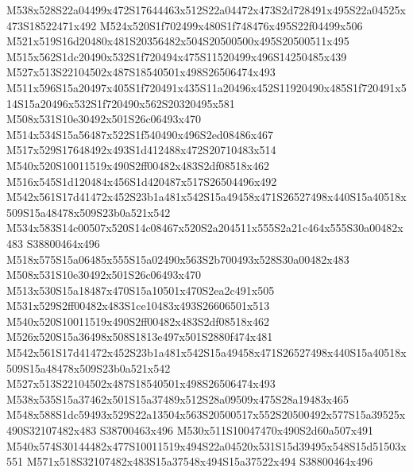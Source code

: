 \documentclass{article}
\begin{document}
\begin{multicols}{2}

M538x528S22a04499x472S17644463x512S22a04472x473S2d728491x495S22a04525x473S18522471x492 M524x520S1f702499x480S1f748476x495S22f04499x506 M521x519S16d20480x481S20356482x504S20500500x495S20500511x495 M515x562S1dc20490x532S1f720494x475S11520499x496S14250485x439 M527x513S22104502x487S18540501x498S26506474x493 M511x596S15a20497x405S1f720491x435S11a20496x452S11920490x485S1f720491x514S15a20496x532S1f720490x562S20320495x581 M508x531S10e30492x501S26c06493x470 M514x534S15a56487x522S1f540490x496S2ed08486x467 M517x529S17648492x493S1d412488x472S20710483x514 M540x520S10011519x490S2ff00482x483S2df08518x462 M516x545S1d120484x456S1d420487x517S26504496x492 M542x561S17d41472x452S23b1a481x542S15a49458x471S26527498x440S15a40518x509S15a48478x509S23b0a521x542 M534x583S14c00507x520S14c08467x520S2a204511x555S2a21c464x555S30a00482x483 S38800464x496 M518x575S15a06485x555S15a02490x563S2b700493x528S30a00482x483 M508x531S10e30492x501S26c06493x470 M513x530S15a18487x470S15a10501x470S2ea2c491x505 M531x529S2ff00482x483S1ce10483x493S26606501x513 M540x520S10011519x490S2ff00482x483S2df08518x462 M526x520S15a36498x508S1813e497x501S2880f474x481 M542x561S17d41472x452S23b1a481x542S15a49458x471S26527498x440S15a40518x509S15a48478x509S23b0a521x542 M527x513S22104502x487S18540501x498S26506474x493 M538x535S15a37462x501S15a37489x512S28a09509x475S28a19483x465 M548x588S1dc59493x529S22a13504x563S20500517x552S20500492x577S15a39525x490S32107482x483 S38700463x496 M530x511S10047470x490S2d60a507x491 M540x574S30144482x477S10011519x494S22a04520x531S15d39495x548S15d51503x551 M571x518S32107482x483S15a37548x494S15a37522x494 S38800464x496






\end{multicols}
\end{document}
